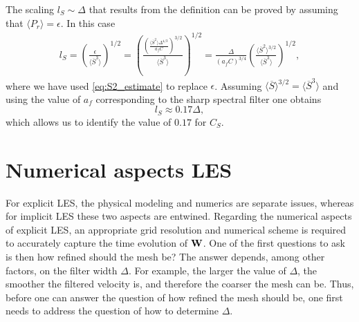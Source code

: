 \documentclass[oneside,a4paper,11pt]{report}
\begin{document}
The scaling $l_S \sim \Delta$ that results from the definition can be proved by assuming that $\langle P_r \rangle = \epsilon$. In this case
\begin{align}
l_S = \left ( \frac{\epsilon}{ \langle \overline{S}^3 \rangle} \right ) ^{1/2} = \left ( \frac{ \left (\frac{\langle \overline{S}^2 \rangle \Delta^{4/3} }{a_f C} \right )^{3/2}}{ \langle \overline{S}^3 \rangle} \right ) ^{1/2} = \frac{\Delta}{ (a_f C)^{3/4}} \left ( \frac{ \langle \overline{S}^2 \rangle^{3/2}}{\langle \overline{S}^3 \rangle} \right )^{1/2},
\end{align}
where we have used \cref{eq:S2_estimate} to replace $\epsilon$. Assuming $\langle \overline{S} \rangle^{3/2} = \langle \overline{S}^3 \rangle$ and using the value of $a_f$ corresponding to the sharp spectral filter one obtains
\begin{equation}
l_S \approx 0.17 \Delta,
\end{equation}
which allows us to identify the value of $0.17$ for $C_S$.

\section{Numerical aspects LES}
For explicit LES, the physical modeling and numerics are separate issues, whereas for implicit LES these two aspects are entwined. Regarding the numerical aspects of explicit LES, an appropriate grid resolution and numerical scheme is required to accurately capture the time evolution of $\mathbf{W}$. One of the first questions to ask is then how refined should the mesh be? The answer depends, among other factors, on the filter width $\Delta$. For example, the larger the value of $\Delta$, the smoother the filtered velocity is, and therefore the coarser the mesh can be. Thus, before one can answer the question of how refined the mesh should be, one first needs to address the question of how to determine $\Delta$.
\end{document}
